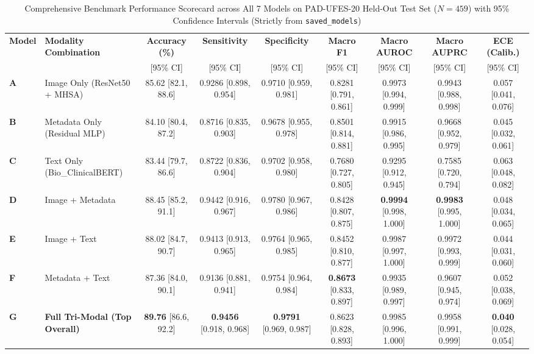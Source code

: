 \documentclass[conference]{IEEEtran}
\begin{document}
\begin{table}[t]
\caption{Comprehensive Benchmark Performance Scorecard across All 7 Models on PAD-UFES-20 Held-Out Test Set ($N=459$) with 95\% Confidence Intervals (Strictly from \texttt{saved\_models})}
\label{tab:master_scorecard}
\centering
\scriptsize
\setlength{\tabcolsep}{3.5pt}
\begin{tabular}{@{}llccccccc@{}}
\toprule
\textbf{Model} & \textbf{Modality Combination} & \textbf{Accuracy (\%)} & \textbf{Sensitivity} & \textbf{Specificity} & \textbf{Macro F1} & \textbf{Macro AUROC} & \textbf{Macro AUPRC} & \textbf{ECE (Calib.)} \\
 & & [95\% CI] & [95\% CI] & [95\% CI] & [95\% CI] & [95\% CI] & [95\% CI] & [95\% CI] \\
\midrule
\textbf{A} & Image Only (ResNet50 + MHSA) & 85.62 [82.1, 88.6] & 0.9286 [0.898, 0.954] & 0.9710 [0.959, 0.981] & 0.8281 [0.791, 0.861] & 0.9973 [0.994, 0.999] & 0.9943 [0.988, 0.998] & 0.057 [0.041, 0.076] \\
\textbf{B} & Metadata Only (Residual MLP) & 84.10 [80.4, 87.2] & 0.8716 [0.835, 0.903] & 0.9678 [0.955, 0.978] & 0.8501 [0.814, 0.881] & 0.9915 [0.986, 0.995] & 0.9668 [0.952, 0.979] & 0.045 [0.032, 0.061] \\
\textbf{C} & Text Only (Bio\_ClinicalBERT) & 83.44 [79.7, 86.6] & 0.8722 [0.836, 0.904] & 0.9702 [0.958, 0.980] & 0.7680 [0.727, 0.805] & 0.9295 [0.912, 0.945] & 0.7585 [0.720, 0.794] & 0.063 [0.048, 0.082] \\
\textbf{D} & Image + Metadata & 88.45 [85.2, 91.1] & 0.9442 [0.916, 0.967] & 0.9780 [0.967, 0.986] & 0.8428 [0.807, 0.875] & \textbf{0.9994} [0.998, 1.000] & \textbf{0.9983} [0.995, 1.000] & 0.048 [0.034, 0.065] \\
\textbf{E} & Image + Text & 88.02 [84.7, 90.7] & 0.9413 [0.913, 0.965] & 0.9764 [0.965, 0.985] & 0.8452 [0.810, 0.877] & 0.9987 [0.997, 1.000] & 0.9972 [0.993, 0.999] & 0.044 [0.031, 0.060] \\
\textbf{F} & Metadata + Text & 87.36 [84.0, 90.1] & 0.9136 [0.881, 0.941] & 0.9754 [0.964, 0.984] & \textbf{0.8673} [0.833, 0.897] & 0.9935 [0.989, 0.997] & 0.9607 [0.945, 0.974] & 0.052 [0.038, 0.069] \\
\textbf{G} & \textbf{Full Tri-Modal (Top Overall)} & \textbf{89.76} [86.6, 92.2] & \textbf{0.9456} [0.918, 0.968] & \textbf{0.9791} [0.969, 0.987] & 0.8623 [0.828, 0.893] & 0.9985 [0.996, 1.000] & 0.9958 [0.991, 0.999] & \textbf{0.040} [0.028, 0.054] \\
\bottomrule
\end{tabular}
\end{table}
\end{document}
